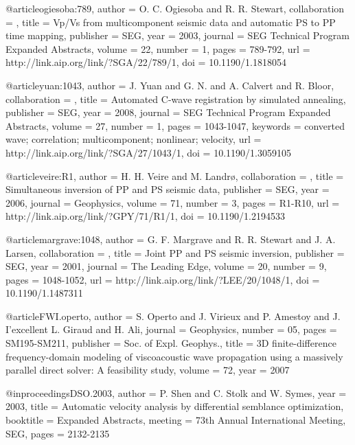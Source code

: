 {@article{ogiesoba:789,
author = {O. C. Ogiesoba and R. R. Stewart},
collaboration = {},
title = {Vp/{V}s from multicomponent seismic data and automatic {PS}
                  to {PP} time mapping},
publisher = {SEG},
year = {2003},
journal = {SEG Technical Program Expanded Abstracts},
volume = {22},
number = {1},
pages = {789-792},
url = {http://link.aip.org/link/?SGA/22/789/1},
doi = {10.1190/1.1818054}
}





@article{yuan:1043,
author = {J. Yuan and G. N. and A. Calvert and
                  R. Bloor},
collaboration = {},
title = {Automated {C}-wave registration by simulated annealing},
publisher = {SEG},
year = {2008},
journal = {SEG Technical Program Expanded Abstracts},
volume = {27},
number = {1},
pages = {1043-1047},
keywords = {converted wave; correlation; multicomponent; nonlinear;
                  velocity},
url = {http://link.aip.org/link/?SGA/27/1043/1},
doi = {10.1190/1.3059105}
}

@article{veire:R1,
author = {H. H. Veire and M. Landr\o},
collaboration = {},
title = {Simultaneous inversion of {PP} and {PS} seismic data},
publisher = {SEG},
year = {2006},
journal = {Geophysics},
volume = {71},
number = {3},
pages = {R1-R10},
url = {http://link.aip.org/link/?GPY/71/R1/1},
doi = {10.1190/1.2194533}
}

@article{margrave:1048,
author = {G. F. Margrave and R. R. Stewart and J. A. Larsen},
collaboration = {},
title = {Joint {PP} and {PS} seismic inversion},
publisher = {SEG},
year = {2001},
journal = {The Leading Edge},
volume = {20},
number = {9},
pages = {1048-1052},
url = {http://link.aip.org/link/?LEE/20/1048/1},
doi = {10.1190/1.1487311}
}







@article{FWI.operto,
  author = { S. Operto and J. Virieux and P. Amestoy and J.
I'excellent L. Giraud and H. Ali},
  journal = {Geophysics},
  number = {05},
  pages = {SM195-SM211},
  publisher = {Soc. of Expl. Geophys.},
  title = { 3{D} finite-difference frequency-domain modeling of
viscoacoustic wave propagation using a massively parallel direct
solver: A feasibility study},
  volume = {72},
  year = {2007}}

@inproceedings{DSO.2003,
  author    = {P. Shen and C. Stolk and W. Symes},
  year      = {2003},
  title     = {Automatic velocity analysis by differential semblance
optimization},
  booktitle = {Expanded Abstracts},
  meeting   = {73th Annual International Meeting, SEG},
  pages     = {2132-2135}
}

}
